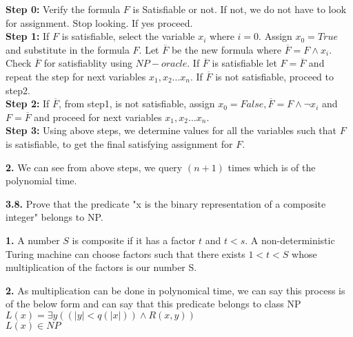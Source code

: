 \documentclass [12pt]{article}
\theoremstyle{definition}
\begin{document}
\phantom{1em} {\bf Step 0:} Verify the formula $F$ is Satisfiable or not. If not, we do not have to look for assignment. Stop looking. If yes proceed. \\
\phantom{1em} {\bf Step 1:} If $F$ is satisfiable, select the variable $x_{i}$ where $i=0$. Assign $x_{0}=True$ and substitute in the formula $F$. Let $ \overline F$ be the new formula where $ \overline F = F \land x_{i}$. Check $ \overline F$ for satisfiablity using $NP-oracle$. If $ \overline F$ is satisfiable let $F = \overline F$ and repeat the step for next variables $x_{1}, x_{2}...x_{n}$. If $ \overline F$ is not satisfiable, proceed to step2. \\
\phantom{1em} {\bf Step 2:} If $ \overline F $, from step1, is not satisfiable, assign $x_{0} = False, \overline F = F \land \neg x_{i}$ and $F = \overline F$ and proceed for next variables $x_{1}, x_{2}...x_{n}$.\\
\phantom{1em} {\bf Step 3:} Using above steps, we determine values for all the variables such that $F$ is satisfiable, to get the final satisfying assignment for $F$. 

\phantom{1em} {\bf 2.} We can see from above steps, we query $(n +1)$ times which is of the polynomial time. 

{\bf 3.8.} Prove that the predicate "x is the binary representation of a composite integer" belongs to NP.

\phantom{1em} {\bf 1.} A number $S$ is composite if it has a factor $t$ and $t < s$. A non-deterministic Turing machine can choose factors such that there exists $1 < t < S$ whose multiplication of the factors is our number S. 

\phantom{1em} {\bf 2.} As multiplication can be done in polynomical time, we can say this process is of the below form and can say that this predicate belongs to class NP \\

\phantom{100cm} $ L(x) = \exists y ((|y| < q(|x|)) \land R(x,y)) $ \\
\phantom{100cm} $ L(x) \in NP $
\end{document}
